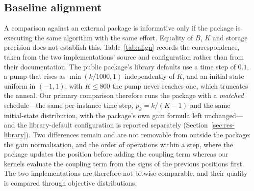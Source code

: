 \documentclass[11pt,a4paper]{article}
\begin{document}
\subsection{Baseline alignment}\label{sec:align}
A comparison against an external package is informative only if the package is executing the same algorithm with the same effort. Equality of $B$, $K$ and storage precision does not establish this. Table~\ref{tab:align} records the correspondence, taken from the two implementations' source and configuration rather than from their documentation. The public package's library defaults use a time step of $0.1$, a pump that rises as $\min(k/1000,1)$ independently of $K$, and an initial state uniform in $(-1,1)$; with $K\le 800$ the pump never reaches one, which truncates the anneal. Our primary comparison therefore runs the package with a \emph{matched} schedule---the same per-instance time step, $p_k=k/(K-1)$ and the same initial-state distribution, with the package's own gain formula left unchanged---and the library-default configuration is reported separately (Section~\ref{sec:res-library}). Two differences remain and are not removable from outside the package: the gain normalisation, and the order of operations within a step, where the package updates the position before adding the coupling term whereas our kernels evaluate the coupling term from the signs of the previous positions first. The two implementations are therefore not bitwise comparable, and their quality is compared through objective distributions.
\end{document}
